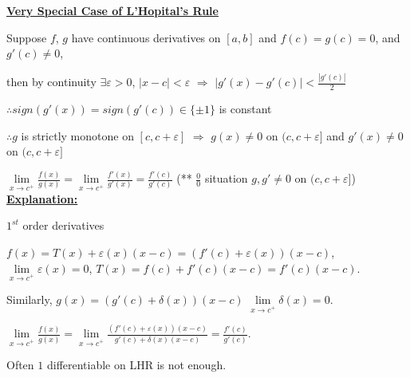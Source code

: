 \documentclass[12pt]{article}
\newcommand{\abs}[1]{\left| #1 \right|}
\theoremstyle{plain}
\newcommand{\ep}{\varepsilon}
\newcommand{\dlim}{\displaystyle\lim\limits}
\begin{document}
	\textbf{\underline{Very Special Case of L'Hopital's Rule}}

	Suppose $f$, $g$ have continuous derivatives on $[a,b]$ 
	and $f(c) = g(c) = 0$, and $g'(c) \neq 0$, 
	
	then by continuity $\exists \ep >0$, $\abs{x-c} < \ep$
	$\Rightarrow$ $\abs{g'(x)-g'(c)}<\frac{\abs{g'(c)}}2$

	$\therefore sign (g'(x)) = sign (g'(c)) \in \{\pm 1\}$ is constant

	$\therefore g$ is strictly monotone on $[c, c+\ep]$ $\Rightarrow$ 
	$g(x)\neq 0$ on $(c, c+\ep]$ and $g'(x) \neq 0$ on $(c,c+\ep]$

	$\dlim_{x\to c^+}\frac{f(x)}{g(x)}=\dlim_{x\to c^+}\frac{f'(x)}{g'(x)}
	=\frac{f'(c)}{g'(c)}$ (** $\frac 00$ situation 
	$g,g'\neq 0$ on $(c,c+\ep]$)\\

	\underline{\textbf{Explanation: }}

	$1^{st}$ order derivatives

	$f(x) = T(x) + \ep(x)(x-c)=(f'(c)+\ep(x))(x-c)$,
	$\dlim_{x\to c^+}\ep(x)=0 $, $T(x) = f(c)+f'(c)(x-c) = f'(c)(x-c)$.

	Similarly, $g(x) = (g'(c)+\delta(x))(x-c)$ $\dlim_{x\to c^+} \delta(x) = 0$.

	$\dlim_{x\to c^+} \frac{f(x)}{g(x)}
	= \dlim_{x\to c^+} \frac{(f'(c)+\ep(x))(x-c)}{g'(c)+\delta(x)(x-c)}
	=\frac{f'(c)}{g'(c)}$.

	Often $1$ differentiable on LHR is not enough.\\
\end{document}

